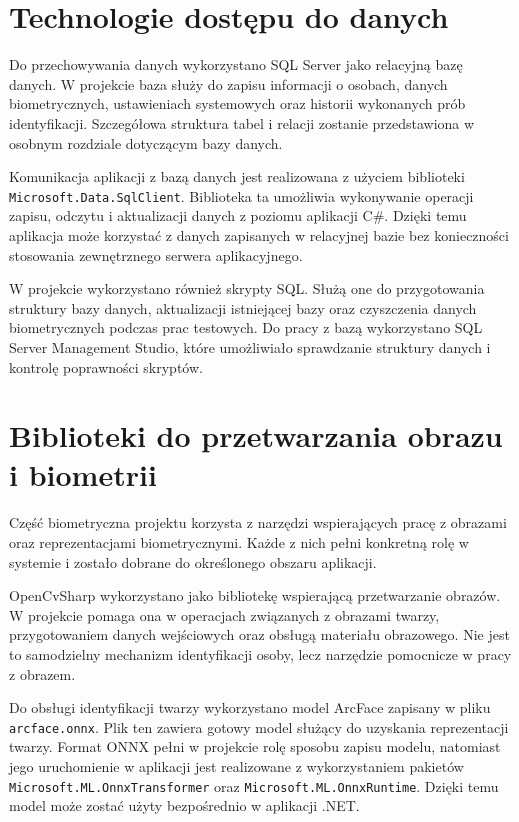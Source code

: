 \section{Technologie dostępu do danych}

Do przechowywania danych wykorzystano SQL Server jako relacyjną bazę danych. W projekcie baza służy do zapisu informacji o osobach, danych biometrycznych, ustawieniach systemowych oraz historii wykonanych prób identyfikacji. Szczegółowa struktura tabel i relacji zostanie przedstawiona w osobnym rozdziale dotyczącym bazy danych.

Komunikacja aplikacji z bazą danych jest realizowana z użyciem biblioteki \texttt{Microsoft.Data.SqlClient}. Biblioteka ta umożliwia wykonywanie operacji zapisu, odczytu i aktualizacji danych z poziomu aplikacji C\#. Dzięki temu aplikacja może korzystać z danych zapisanych w relacyjnej bazie bez konieczności stosowania zewnętrznego serwera aplikacyjnego.

W projekcie wykorzystano również skrypty SQL. Służą one do przygotowania struktury bazy danych, aktualizacji istniejącej bazy oraz czyszczenia danych biometrycznych podczas prac testowych. Do pracy z bazą wykorzystano SQL Server Management Studio, które umożliwiało sprawdzanie struktury danych i kontrolę poprawności skryptów.

\section{Biblioteki do przetwarzania obrazu i biometrii}

Część biometryczna projektu korzysta z narzędzi wspierających pracę z obrazami oraz reprezentacjami biometrycznymi. Każde z nich pełni konkretną rolę w systemie i zostało dobrane do określonego obszaru aplikacji.

OpenCvSharp wykorzystano jako bibliotekę wspierającą przetwarzanie obrazów. W projekcie pomaga ona w operacjach związanych z obrazami twarzy, przygotowaniem danych wejściowych oraz obsługą materiału obrazowego. Nie jest to samodzielny mechanizm identyfikacji osoby, lecz narzędzie pomocnicze w pracy z obrazem.

Do obsługi identyfikacji twarzy wykorzystano model ArcFace zapisany w pliku \texttt{arcface.onnx}. Plik ten zawiera gotowy model służący do uzyskania reprezentacji twarzy. Format ONNX pełni w projekcie rolę sposobu zapisu modelu, natomiast jego uruchomienie w aplikacji jest realizowane z wykorzystaniem pakietów \texttt{Microsoft.ML.OnnxTransformer} oraz \texttt{Microsoft.ML.OnnxRuntime}. Dzięki temu model może zostać użyty bezpośrednio w aplikacji .NET.

